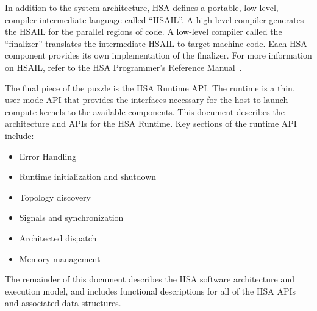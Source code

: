 \documentclass[final]{book}
\begin{document}
In addition to the system architecture, HSA defines a portable, low-level,
compiler intermediate language called ``HSAIL''.  A high-level compiler generates
the HSAIL for the parallel regions of code. A low-level compiler called the
``finalizer'' translates the intermediate HSAIL to target machine code.  Each
HSA component provides its own implementation of the finalizer.  For more
information on HSAIL, refer to the HSA Programmer's Reference Manual~\cite{prm}.

The final piece of the puzzle is the HSA Runtime API.  The runtime is a thin,
user-mode API that provides the interfaces necessary for the host to launch
compute kernels to the available components. This document describes the
architecture and APIs for the HSA Runtime. Key sections of the runtime API
include:
\begin{itemize}
\item Error Handling
\item Runtime initialization and shutdown
\item Topology discovery
\item Signals and synchronization
\item Architected dispatch
\item Memory management
\end{itemize}

The remainder of this document describes the HSA software architecture and
execution model, and includes functional descriptions for all of the HSA APIs
and associated data structures.
\end{document}
